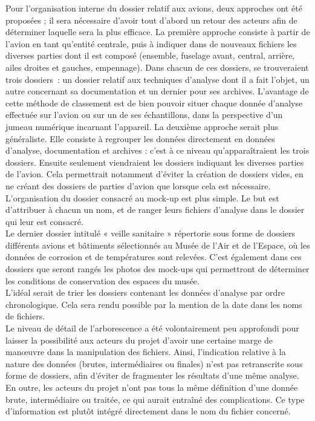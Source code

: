 Pour l’organisation interne du dossier relatif aux avions, deux approches ont été proposées ; il sera nécessaire d’avoir tout d’abord un retour des acteurs afin de déterminer laquelle sera la plus efficace. La première approche consiste à partir de l'avion en tant qu'entité centrale, puis à indiquer dans de nouveaux fichiers les diverses parties dont il est composé (ensemble, fuselage avant, central, arrière, ailes droites et gauches, empennage). Dans chacun de ces dossiers, se trouveraient trois dossiers : un dossier relatif aux techniques d’analyse dont il a fait l’objet, un autre concernant sa documentation et un dernier pour ses archives. L’avantage de cette méthode de classement est de bien pouvoir situer chaque donnée d'analyse effectuée sur l’avion ou sur un de ses échantillons, dans la perspective d'un jumeau numérique incarnant l'appareil. La deuxième approche serait plus généraliste. Elle consiste à regrouper les données directement en données d’analyse, documentation et archives : c’est à ce niveau qu’apparaîtraient les trois dossiers. Ensuite seulement viendraient les dossiers indiquant les diverses parties de l’avion. Cela permettrait notamment d’éviter la création de dossiers vides, en ne créant des dossiers de parties d’avion que lorsque cela est nécessaire.\\

L’organisation du dossier consacré au mock-up est plus simple. Le but est d’attribuer à chacun un nom, et de ranger leurs fichiers d’analyse dans le dossier qui leur est consacré.\\

Le dernier dossier intitulé « veille sanitaire » répertorie sous forme de dossiers différents avions et bâtiments sélectionnés au Musée de l’Air et de l’Espace, où les données de corrosion et de températures sont relevées. C’est également dans ces dossiers que seront rangés les photos des mock-ups qui permettront de déterminer les conditions de conservation des espaces du musée.\\

L’idéal serait de trier les dossiers contenant les données d’analyse par ordre chronologique. Cela sera rendu possible par la mention de la date dans les noms de fichiers.\\

Le niveau de détail de l’arborescence a été volontairement peu approfondi pour laisser la possibilité aux acteurs du projet d’avoir une certaine marge de manœuvre dans la manipulation des fichiers. Ainsi, l'indication relative à la nature des données (brutes, intermédiaires ou finales) n'est pas retranscrite sous forme de dossiers, afin d'éviter de fragmenter les résultats d'une même analyse. En outre, les acteurs du projet n’ont pas tous la même définition d’une donnée brute, intermédiaire ou traitée, ce qui aurait entraîné des complications. Ce type d'information est plutôt intégré directement dans le nom du fichier concerné.\\ 

